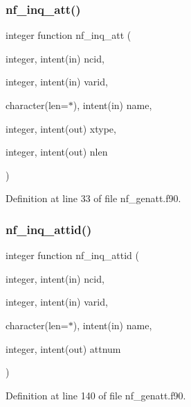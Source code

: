 \subsubsection{\texorpdfstring{nf\+\_\+inq\+\_\+att()}{nf\_inq\_att()}}
{\footnotesize\ttfamily integer function nf\+\_\+inq\+\_\+att (\begin{DoxyParamCaption}\item[{integer, intent(in)}]{ncid,  }\item[{integer, intent(in)}]{varid,  }\item[{character(len=$\ast$), intent(in)}]{name,  }\item[{integer, intent(out)}]{xtype,  }\item[{integer, intent(out)}]{nlen }\end{DoxyParamCaption})}



Definition at line 33 of file nf\+\_\+genatt.\+f90.

\mbox{\label{nf__genatt_8f90_a34e547f3eea2a17b2ea4d327831e62ca}} 
\subsubsection{\texorpdfstring{nf\+\_\+inq\+\_\+attid()}{nf\_inq\_attid()}}
{\footnotesize\ttfamily integer function nf\+\_\+inq\+\_\+attid (\begin{DoxyParamCaption}\item[{integer, intent(in)}]{ncid,  }\item[{integer, intent(in)}]{varid,  }\item[{character(len=$\ast$), intent(in)}]{name,  }\item[{integer, intent(out)}]{attnum }\end{DoxyParamCaption})}



Definition at line 140 of file nf\+\_\+genatt.\+f90.

\mbox{\label{nf__genatt_8f90_ab080bc8090ac0a28184fdb3abbc860e6}} 
